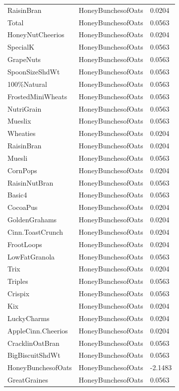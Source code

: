 \begin{table}[!htbp]
\begin{tabular}{lll}
\\
RaisinBran & HoneyBunchesofOats & 0.0204
\\
Total & HoneyBunchesofOats & 0.0563
\\
HoneyNutCheerios & HoneyBunchesofOats & 0.0204
\\
SpecialK & HoneyBunchesofOats & 0.0563
\\
GrapeNuts & HoneyBunchesofOats & 0.0563
\\
SpoonSizeShdWt & HoneyBunchesofOats & 0.0563
\\
100\%Natural & HoneyBunchesofOats & 0.0563
\\
FrostedMiniWheats & HoneyBunchesofOats & 0.0563
\\
NutriGrain & HoneyBunchesofOats & 0.0563
\\
Mueslix & HoneyBunchesofOats & 0.0563
\\
Wheaties & HoneyBunchesofOats & 0.0204
\\
RaisinBran & HoneyBunchesofOats & 0.0204
\\
Muesli & HoneyBunchesofOats & 0.0563
\\
CornPops & HoneyBunchesofOats & 0.0204
\\
RaisinNutBran & HoneyBunchesofOats & 0.0563
\\
Basic4 & HoneyBunchesofOats & 0.0563
\\
CocoaPus & HoneyBunchesofOats & 0.0204
\\
GoldenGrahams & HoneyBunchesofOats & 0.0204
\\
Cinn.ToastCrunch & HoneyBunchesofOats & 0.0204
\\
FrootLoops & HoneyBunchesofOats & 0.0204
\\
LowFatGranola & HoneyBunchesofOats & 0.0563
\\
Trix & HoneyBunchesofOats & 0.0204
\\
Triples & HoneyBunchesofOats & 0.0563
\\
Crispix & HoneyBunchesofOats & 0.0563
\\
Kix & HoneyBunchesofOats & 0.0204
\\
LuckyCharms & HoneyBunchesofOats & 0.0204
\\
AppleCinn.Cheerios & HoneyBunchesofOats & 0.0204
\\
CracklinOatBran & HoneyBunchesofOats & 0.0563
\\
BigBiscuitShdWt & HoneyBunchesofOats & 0.0563
\\
HoneyBunchesofOats & HoneyBunchesofOats & -2.1483
\\
GreatGraines & HoneyBunchesofOats & 0.0563

\end{tabular}
\end{table}
